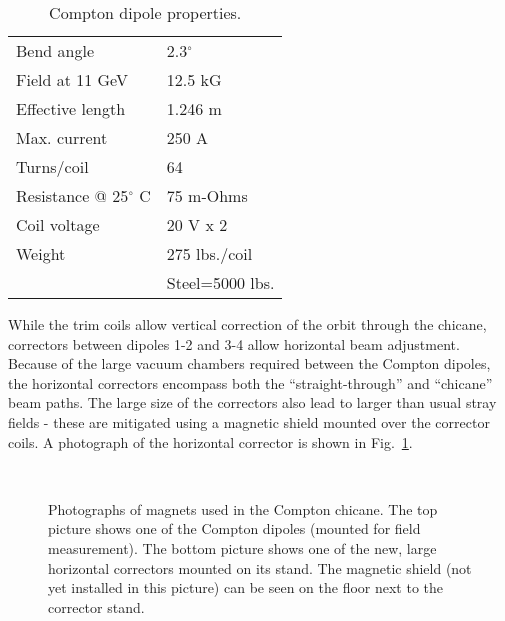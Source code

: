 {\begin{table}[hbt]
\begin{center}
\begin{tabular}{|l|l|} \hline
Bend angle        &   2.3$^{\circ}$ \\
Field at 11 GeV   &   12.5 kG \\
Effective length  &   1.246 m \\
Max. current      &   250 A  \\
Turns/coil        &  64 \\
Resistance @ 25$^\circ$ C & 75 m-Ohms \\
Coil voltage      & 20 V x 2 \\
Weight            & 275 lbs./coil \\
                  & Steel=5000 lbs. \\
\hline
\end{tabular}
\caption{Compton dipole properties.\label{tab:compton_dipoles}}
\end{center}
\end{table}


While the trim coils allow vertical correction of the orbit through the chicane, correctors between
dipoles 1-2 and 3-4 allow horizontal beam adjustment. Because of the large vacuum chambers required
between the Compton dipoles, the horizontal correctors encompass both the ``straight-through'' and
``chicane'' beam paths. The large size of the correctors also lead to larger than usual stray fields -
these are mitigated using a magnetic shield mounted over the corrector coils. A photograph of the horizontal
corrector is shown in Fig.~\ref{fig:magnet_photos}.

\begin{figure}
\begin{center}
\\
\caption{Photographs of magnets used in the Compton chicane. The top picture shows one of
the Compton dipoles (mounted for field measurement). The bottom picture shows one of the new, large
horizontal correctors mounted on its stand. The magnetic shield (not yet installed in this picture) can be
seen on the floor next to the corrector stand.\label{fig:magnet_photos}}
\end{center}
\end{figure}

}
